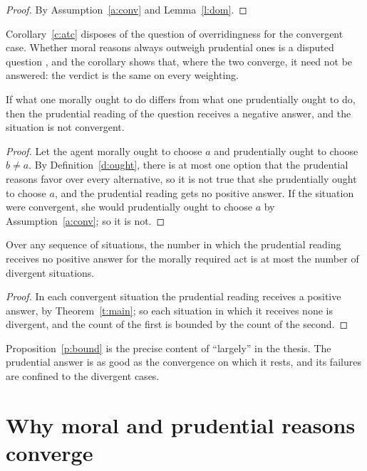 \documentclass{situationist-preprint}
\begin{document}
\begin{proof}
By Assumption~\ref{a:conv} and Lemma~\ref{l:dom}.
\end{proof}

Corollary~\ref{c:atc} disposes of the question of overridingness for the convergent case. Whether moral reasons always outweigh prudential ones is a disputed question \citep{Wolf1982,Copp1997}, and the corollary shows that, where the two converge, it need not be answered: the verdict is the same on every weighting.

\begin{proposition}[Divergence]\label{p:div}
If what one morally ought to do differs from what one prudentially ought to do, then the prudential reading of the question receives a negative answer, and the situation is not convergent.
\end{proposition}

\begin{proof}
Let the agent morally ought to choose $a$ and prudentially ought to choose $b\neq a$. By Definition~\ref{d:ought}, there is at most one option that the prudential reasons favor over every alternative, so it is not true that she prudentially ought to choose $a$, and the prudential reading gets no positive answer. If the situation were convergent, she would prudentially ought to choose $a$ by Assumption~\ref{a:conv}; so it is not.
\end{proof}

\begin{proposition}\label{p:bound}
Over any sequence of situations, the number in which the prudential reading receives no positive answer for the morally required act is at most the number of divergent situations.
\end{proposition}

\begin{proof}
In each convergent situation the prudential reading receives a positive answer, by Theorem~\ref{t:main}; so each situation in which it receives none is divergent, and the count of the first is bounded by the count of the second.
\end{proof}

Proposition~\ref{p:bound} is the precise content of \enquote{largely} in the thesis. The prudential answer is as good as the convergence on which it rests, and its failures are confined to the divergent cases.

\section{Why moral and prudential reasons converge}\label{s:conv}
\end{document}
